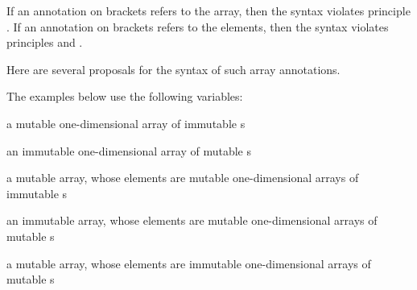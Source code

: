 If an annotation on brackets refers to the array, then the syntax violates
principle \wholeTypePrinciple{}.  If an annotation on brackets refers
to the elements, then the syntax violates principles
\arrayAddLevelsPrinciple{} and \multipleVariablesPrinciple{}.


Here are several proposals for the syntax of such array annotations.

The examples below use the following variables:

\begin{description}
\itemsep 0pt \parskip 0pt
\item{}
  a mutable one-dimensional array of immutable s
\item{}
  an immutable one-dimensional array of mutable s
\item{}
  a mutable array, whose elements are mutable
  one-dimensional arrays of immutable s
\item{}
  an immutable array, whose elements are mutable
  one-dimensional arrays of mutable s
\item{}
  a mutable array, whose elements are immutable
  one-dimensional arrays of mutable s
\end{description}


